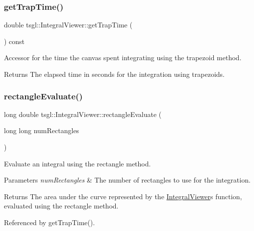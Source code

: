 \subsubsection{\texorpdfstring{get\+Trap\+Time()}{getTrapTime()}}
{\footnotesize\ttfamily double tsgl\+::\+Integral\+Viewer\+::get\+Trap\+Time (\begin{DoxyParamCaption}{ }\end{DoxyParamCaption}) const\hspace{0.3cm}{\ttfamily [inline]}}



Accessor for the time the canvas spent integrating using the trapezoid method. 

\begin{DoxyReturn}{Returns}
The elapsed time in seconds for the integration using trapezoids. 
\end{DoxyReturn}
\mbox{\label{classtsgl_1_1_integral_viewer_a213d814ac293686ecd06c45344fa242f}} 
\subsubsection{\texorpdfstring{rectangle\+Evaluate()}{rectangleEvaluate()}}
{\footnotesize\ttfamily long double tsgl\+::\+Integral\+Viewer\+::rectangle\+Evaluate (\begin{DoxyParamCaption}\item[{long long}]{num\+Rectangles }\end{DoxyParamCaption})}



Evaluate an integral using the rectangle method. 


\begin{DoxyParams}{Parameters}
{\em num\+Rectangles} & The number of rectangles to use for the integration. \\
\hline
\end{DoxyParams}
\begin{DoxyReturn}{Returns}
The area under the curve represented by the \hyperlink{classtsgl_1_1_integral_viewer}{Integral\+Viewer}\textquotesingle{}s function, evaluated using the rectangle method. 
\end{DoxyReturn}


Referenced by get\+Trap\+Time().

